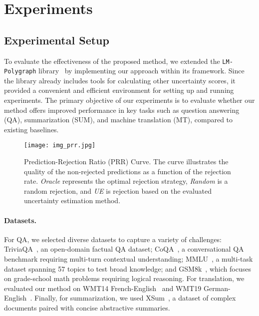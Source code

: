 
\section{Experiments}
\subsection{Experimental Setup}
  To evaluate the effectiveness of the proposed method, we extended the \texttt{LM-Polygraph} library~\citep{vashurin2024benchmarkinguncertaintyquantificationmethods,fadeeva-etal-2023-lm} by implementing our approach within its framework. Since the library already includes tools for calculating other uncertainty scores, it provided a convenient and efficient environment for setting up and running experiments. The primary objective of our experiments is to evaluate whether our method offers improved performance in key tasks such as question answering (QA), summarization (SUM), and machine translation (MT), compared to existing baselines.

  \begin{figure}[t!]
    \centering
    \texttt{[image: img\_prr.jpg]}
    \caption{Prediction-Rejection Ratio (PRR) Curve. The curve illustrates the quality of the non-rejected predictions as a function of the rejection rate. \textit{Oracle} represents the optimal rejection strategy, \textit{Random} is a random rejection, and \textit{UE} is rejection based on the evaluated uncertainty estimation method.}
  \label{fig:prr}
  \end{figure}
  
\paragraph{Datasets.}
  For QA, we selected diverse datasets to capture a variety of challenges: TriviaQA~\citep{joshi-etal-2017-triviaqa}, an open-domain factual QA dataset; CoQA~\citep{coqa}, a conversational QA benchmark requiring multi-turn contextual understanding; MMLU~\citep{mmlu}, a multi-task dataset spanning 57 topics to test broad knowledge; and GSM8k~\citep{gsm8k}, which focuses on grade-school math problems requiring logical reasoning. For translation, we evaluated our method on WMT14 French-English~\citep{wmt14} and WMT19 German-English~\citep{wmt19translate}. Finally, for summarization, we used XSum~\citep{xsum}, a dataset of complex documents paired with concise abstractive summaries.

